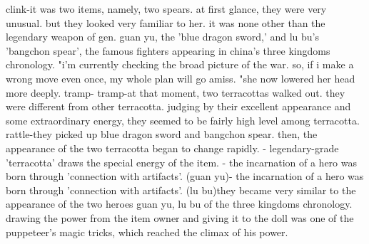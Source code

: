 clink-it was two items, namely, two spears.
at first glance, they were very unusual.
 but they looked very familiar to her.
it was none other than the legendary weapon of gen.
 guan yu, the 'blue dragon sword,' and lu bu's 'bangchon spear', the famous fighters appearing in china's three kingdoms chronology.
"i'm currently checking the broad picture of the war.
 so, if i make a wrong move even once, my whole plan will go amiss.
"she now lowered her head more deeply.
tramp- tramp-at that moment, two terracottas walked out.
 they were different from other terracotta.
judging by their excellent appearance and some extraordinary energy, they seemed to be fairly high level among terracotta.
rattle-they picked up blue dragon sword and bangchon spear.
then, the appearance of the two terracotta began to change rapidly.
- legendary-grade 'terracotta' draws the special energy of the item.
- the incarnation of a hero was born through 'connection with artifacts'.
 (guan yu)- the incarnation of a hero was born through 'connection with artifacts'.
 (lu bu)they became very similar to the appearance of the two heroes guan yu, lu bu of the three kingdoms chronology.
drawing the power from the item owner and giving it to the doll was one of the puppeteer's magic tricks, which reached the climax of his power.


